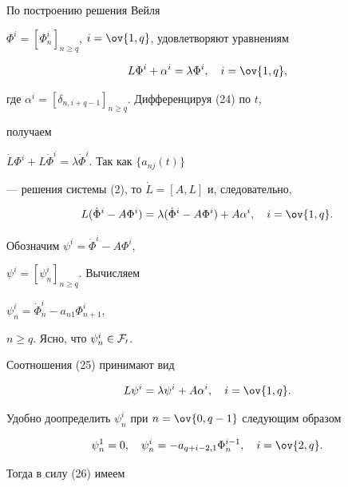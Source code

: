  


\begin{pf} 


По построению решения Вейля 


$\Phi^i=[\Phi^i_n]_{n\ge q}$, $i=\ov{1,q}$, удовлетворяют уравнениям 


\begin{equation} 


L\Phi^i+\alpha^i=\lambda\Phi^i,\quad i=\ov{1,q}, 


\end{equation} 


где $\alpha^i=[\delta_{n,i+q-1}]_{n\ge q}$. Дифференцируя (24) по $t$, 


получаем 


$\Dot L\Phi^i+L\Dot\Phi^i=\lambda\Dot\Phi^i$. Так как $\{a_{nj}(t)\}$ 


--- решения системы (2), то $\Dot L=[A,L]$ и, следовательно, 


\begin{equation} 


L(\Dot\Phi^i-A\Phi^i)=\lambda(\Dot\Phi^i-A\Phi^i)+ 


A\alpha^i,\quad i=\ov{1,q}. 


\end{equation} 


Обозначим $\psi^i=\Dot\Phi^i-A\Phi^i$, 


$\psi^i=[\psi^i_n]_{n\ge q}$. Вычисляем 


$\psi^i_n=\Dot\Phi^i_n-a_{n1}\Phi^i_{n+1}$, 


$n\ge q$. Ясно, что $\psi^i_n\in\cal F_0$. 


Соотношения (25) принимают вид 


\begin{equation} 


L\psi^i=\lambda\psi^i+A\alpha^i,\quad i=\ov{1,q}. 


\end{equation} 


Удобно доопределить $\psi^i_n$ при $n=\ov{0,q-1}$ следующим образом 


\begin{equation} 


\psi^1_n=0,\quad \psi^i_n=-a_{q+i-2,1}\Phi^{i-1}_n,\quad 


i=\ov{2,q}. 


\end{equation} 


Тогда в силу (26) имеем 


$$ 



\end{pf}
